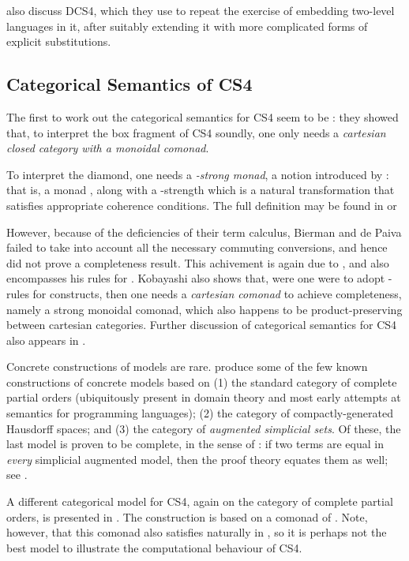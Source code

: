 \documentclass[a4paper]{amsart}
\begin{document}
\cite{Ghani1998} also discuss \textsf{DCS4}, which they use to
repeat the exercise of embedding two-level languages in it, after
suitably extending it with more complicated forms of explicit
substitutions.

\subsection{Categorical Semantics of \textsf{CS4}}

The first to work out the categorical semantics for \textsf{CS4}
seem to be \cite{Bierman1992a, Bierman1996a, Bierman2000a}: they
showed that, to interpret the box fragment of \textsf{CS4}
soundly, one only needs a \emph{cartesian closed category with a
monoidal comonad}.

To interpret the diamond, one needs a \emph{-strong monad},
a notion introduced by \cite{Kobayashi1997}:  that is, a monad
, along with a -strength  which is a natural transformation that satisfies appropriate
coherence conditions. The full definition may be found in
\citep{Kobayashi1997} or \citep{Bierman2000a}

However, because of the deficiencies of their term calculus,
Bierman and de Paiva failed to take into account all the necessary
commuting conversions, and hence did not prove a completeness
result. This achivement is again due to \cite{Kobayashi1997}, and
also encompasses his rules for . Kobayashi also shows
that, were one were to adopt -rules for 
constructs, then one needs a \emph{cartesian comonad} to achieve
completeness, namely a strong monoidal comonad, which also happens
to be product-preserving between cartesian categories. Further
discussion of categorical semantics for \textsf{CS4} also appears
in \citep{Alechina2001}.

Concrete constructions of models are rare.
\cite{Goubault-Larrecq1999a, Goubault-Larrecq1999b,
Goubault-Larrecq2003} produce some of the few known constructions
of concrete models based on (1) the standard category
 of complete partial orders (ubiquitously present in
domain theory and most early attempts at semantics for programming
languages); (2) the category  of
compactly-generated Hausdorff spaces; and (3) the category of
\emph{augmented simplicial sets}. Of these, the last model is
proven to be complete, in the sense of \cite{Friedman1975}: if two
terms are equal in \emph{every} simplicial augmented model, then
the proof theory equates them as well; see
\citep{Goubault-Larrecq2003}.

A different categorical model for \textsf{CS4}, again on the
category  of complete partial orders, is presented
in \citep{Kobayashi1997}. The construction is based on a comonad
of \cite{Brookes1991, Brookes1992}. Note, however, that this
comonad also satisfies  naturally in , so
it is perhaps not the best model to illustrate the computational
behaviour of \textsf{CS4}.
\end{document}
